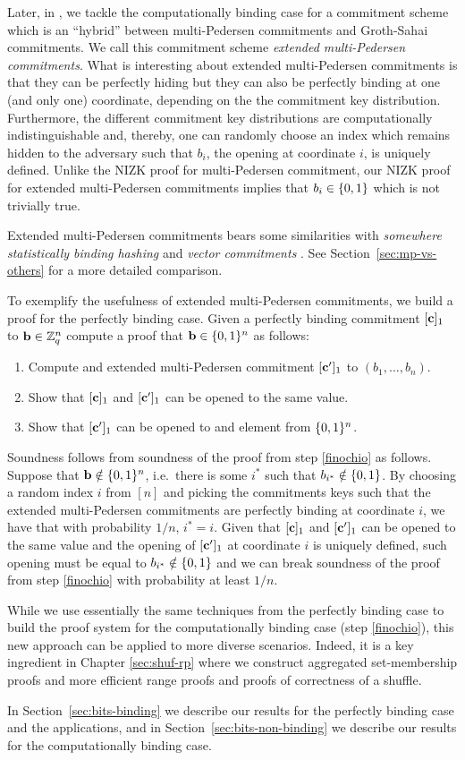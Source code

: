 Later, in \cite{ACNS:GonRaf16}, we tackle the computationally binding case for a commitment scheme which is an ``hybrid'' between multi-Pedersen commitments and Groth-Sahai commitments. We call this commitment scheme \emph{extended multi-Pedersen commitments}. What is interesting about extended multi-Pedersen commitments is that they can be perfectly hiding but they can also be perfectly binding at one (and only one) coordinate, depending on the the commitment key distribution. Furthermore, the different commitment key distributions are computationally indistinguishable and, thereby, one can randomly choose an index which remains hidden to the adversary such that $b_i$, the opening at coordinate $i$, is uniquely defined. Unlike the NIZK proof for multi-Pedersen commitment, our NIZK proof for extended multi-Pedersen commitments implies that $b_i\in\{0,1\}$ which is not trivially true.

Extended multi-Pedersen commitments bears some similarities with \emph{somewhere statistically binding hashing} \cite{ITCS:HubWic15} and \emph{vector commitments} \cite{PKC:CatFio13}. See Section~\ref{sec:mp-vs-others} for a more detailed comparison. 

To exemplify the usefulness of extended multi-Pedersen commitments, we build a proof for the perfectly binding case. Given a perfectly binding commitment $[\mathbf{c}]_1$ to $\mathbf{b}\in\mathbb{Z}_q^n$ compute a proof that $\mathbf{b}\in\{0,1\}^n$ as follows:
\begin{enumerate}
\item Compute and extended multi-Pedersen commitment $[\mathbf{c}']_1$ to $(b_1,\ldots,b_n)$.
\item Show that $[\mathbf{c}]_1$ and $[\mathbf{c}']_1$  can be opened to the same value.
\item Show that $[\mathbf{c}']_1$ can be opened to and element from $\{0,1\}^n$. \label{finochio}
\end{enumerate}
Soundness follows from soundness of the proof from step \ref{finochio} as follows. Suppose that $\mathbf{b}\notin \{0,1\}^n$, i.e.~there is some $i^*$ such that $b_{i^*}\notin\{0,1\}$. By choosing a random index $i$ from $[n]$ and picking the commitments keys such that the extended multi-Pedersen commitments are perfectly binding at coordinate $i$, we have that with probability $1/n$, $i^*=i$. Given that $[\mathbf{c}]_1$ and $[\mathbf{c}']_1$ can be opened to the same value and the opening of $[\mathbf{c}']_1$ at coordinate $i$ is uniquely defined, such opening must be equal to $b_{i^*}\notin\{0,1\}$ and we can break soundness of the proof from step \ref{finochio} with probability at least $1/n$.
 
While we use essentially the same techniques from the perfectly binding case to build the proof system for the computationally binding case (step \ref{finochio}), this new approach can be applied to more diverse scenarios. Indeed, it is a key ingredient in Chapter \ref{sec:shuf-rp} where we construct {aggregated set-membership proofs} and more efficient {range proofs} and {proofs of correctness of a shuffle}.

In Section~\ref{sec:bits-binding} we describe our results for the perfectly binding case and the applications, and in Section~\ref{sec:bits-non-binding} we describe our results for the computationally binding case.
